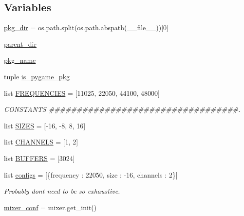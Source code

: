 \subsection*{Variables}
\begin{DoxyCompactItemize}
\item 
\hyperlink{namespacepygame_1_1tests_1_1mixer__test_a6f9d5ec67dddcb46a9b2c48a25b6e6e0}{pkg\+\_\+dir} = os.\+path.\+split(os.\+path.\+abspath(\+\_\+\+\_\+file\+\_\+\+\_\+))\mbox{[}0\mbox{]}
\item 
\hyperlink{namespacepygame_1_1tests_1_1mixer__test_a1b0cdd903bad581d9e6096b553e18bdf}{parent\+\_\+dir}
\item 
\hyperlink{namespacepygame_1_1tests_1_1mixer__test_a49780e84400047c95895e271cc944417}{pkg\+\_\+name}
\item 
tuple \hyperlink{namespacepygame_1_1tests_1_1mixer__test_a9c2ef67c620b572cc234c62fa75a25cc}{is\+\_\+pygame\+\_\+pkg}
\item 
list \hyperlink{namespacepygame_1_1tests_1_1mixer__test_aed9b177cf2c65bb3ed8eb5fb0abb8110}{F\+R\+E\+Q\+U\+E\+N\+C\+I\+ES} = \mbox{[}11025, 22050, 44100, 48000\mbox{]}
\begin{DoxyCompactList}\small\item\em C\+O\+N\+S\+T\+A\+N\+TS \#\#\#\#\#\#\#\#\#\#\#\#\#\#\#\#\#\#\#\#\#\#\#\#\#\#\#\#\#\#\#\#\#\#. \end{DoxyCompactList}\item 
list \hyperlink{namespacepygame_1_1tests_1_1mixer__test_a12830358337670bb1aa55f0611a56a73}{S\+I\+Z\+ES} = \mbox{[}-\/16, -\/8, 8, 16\mbox{]}
\item 
list \hyperlink{namespacepygame_1_1tests_1_1mixer__test_a27acd9a6fa82980f652f58593094a5dc}{C\+H\+A\+N\+N\+E\+LS} = \mbox{[}1, 2\mbox{]}
\item 
list \hyperlink{namespacepygame_1_1tests_1_1mixer__test_ac432d62a66f338cbf9f9f7511bb3dbad}{B\+U\+F\+F\+E\+RS} = \mbox{[}3024\mbox{]}
\item 
list \hyperlink{namespacepygame_1_1tests_1_1mixer__test_aa24f38e6b41761876ee0f4d94f7105a9}{configs} = \mbox{[}\{\textquotesingle{}frequency\textquotesingle{} \+: 22050, \textquotesingle{}size\textquotesingle{} \+: -\/16, \textquotesingle{}channels\textquotesingle{} \+: 2\}\mbox{]}
\begin{DoxyCompactList}\small\item\em Probably don\textquotesingle{}t need to be so exhaustive. \end{DoxyCompactList}\item 
\hyperlink{namespacepygame_1_1tests_1_1mixer__test_aca6e5eca0ec0844c6f113ec4cd67d59e}{mixer\+\_\+conf} = mixer.\+get\+\_\+init()
\end{DoxyCompactItemize}


